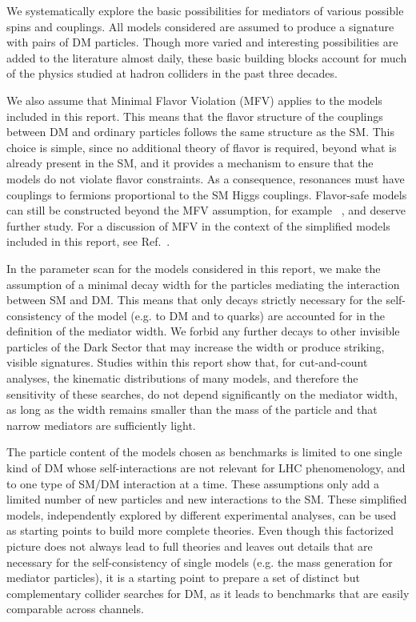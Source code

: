 We systematically explore the basic possibilities for
mediators of various possible spins and couplings.
All models considered are assumed to produce a signature with pairs of DM particles.
Though more varied and
interesting possibilities are added to the literature almost daily,
these basic building blocks account for much of the physics studied at
hadron colliders in the past three decades.

We also assume that Minimal Flavor Violation (MFV) \cite{Chivukula:1987py,Hall:1990ac,Buras:2000dm,D'Ambrosio:2002ex} applies to the
models included in this report. This means that the flavor structure of the
couplings between DM and ordinary particles follows the same
structure as the SM. This choice is simple, since no
additional theory of flavor is required, beyond what is already
present in the SM, and it provides a mechanism to ensure that the
models do not violate flavor constraints.  As a consequence, \spinzero
resonances must have couplings to fermions proportional to the SM Higgs couplings. 
Flavor-safe models can still be constructed beyond the MFV
assumption, for example ~\cite{Agrawal:2014aoa}, and deserve further study.
For a discussion of MFV in the context of the simplified models
included in this report, see Ref.~\cite{DMatLHCProceedings}.

In the parameter scan for the models considered in this report, we make the
assumption of a minimal decay width for the particles mediating the
interaction between SM and DM.  This means that only decays
strictly necessary for the self-consistency of the model (e.g.  to DM
and to quarks) are accounted for in the definition of the mediator
width. We forbid any further decays to other invisible particles of
the Dark Sector that may increase the width or produce striking, visible signatures. 
Studies within this report show that, for cut-and-count analyses, the kinematic distributions of
many models, and therefore the sensitivity of these searches, do not depend
significantly on the mediator width, as long as the width remains smaller
than the mass of the particle and that narrow mediators are sufficiently light.

The particle content of the models chosen as benchmarks is limited to
one single kind of DM whose self-interactions are not relevant for LHC
phenomenology, and to one type of SM/DM interaction at a time. These
assumptions only add a limited number of new particles and new interactions to the
SM. These simplified models, independently explored by different
experimental analyses, can be used as starting points to build more
complete theories. Even though this factorized picture does not always
lead to full theories and leaves out details that are necessary for
the self-consistency of single models (e.g. the mass generation for
mediator particles), it is a starting point to prepare a set of
distinct but complementary collider searches for DM, as
it leads to benchmarks that are easily comparable across channels.


